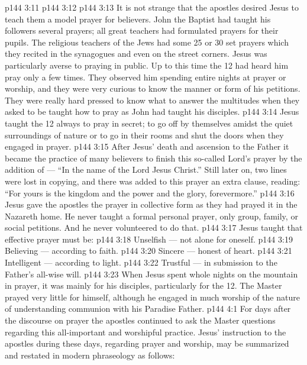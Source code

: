 \vs p144 3:11 
\vs p144 3:12 \hsetoff {}
\vspace*{1ex}
\vs p144 3:13 \pc It is not strange that the apostles desired Jesus to teach them a model prayer for believers. John the Baptist had taught his followers several prayers; all great teachers had formulated prayers for their pupils. The religious teachers of the Jews had some 25 or 30 set prayers which they recited in the synagogues and even on the street corners. Jesus was particularly averse to praying in public. Up to this time the 12 had heard him pray only a few times. They observed him spending entire nights at prayer or worship, and they were very curious to know the manner or form of his petitions. They were really hard pressed to know what to answer the multitudes when they asked to be taught how to pray as John had taught his disciples.
\vs p144 3:14 Jesus taught the 12 always to pray in secret; to go off by themselves amidst the quiet surroundings of nature or to go in their rooms and shut the doors when they engaged in prayer.
\vs p144 3:15 After Jesus’ death and ascension to the Father it became the practice of many believers to finish this so\hyp{}called Lord’s prayer by the addition of --- “In the name of the Lord Jesus Christ.” Still later on, two lines were lost in copying, and there was added to this prayer an extra clause, reading: “For yours is the kingdom and the power and the glory, forevermore.”
\vs p144 3:16 Jesus gave the apostles the prayer in collective form as they had prayed it in the Nazareth home. He never taught a formal personal prayer, only group, family, or social petitions. And he never volunteered to do that.
\vs p144 3:17 Jesus taught that effective prayer must be:
\vs p144 3:18 \bibnobreakspace Unselfish --- not alone for oneself.
\vs p144 3:19 \bibnobreakspace Believing --- according to faith.
\vs p144 3:20 \bibnobreakspace Sincere --- honest of heart.
\vs p144 3:21 \bibnobreakspace Intelligent --- according to light.
\vs p144 3:22 \bibnobreakspace Trustful --- in submission to the Father’s all\hyp{}wise will.
\vs p144 3:23 \pc When Jesus spent whole nights on the mountain in prayer, it was mainly for his disciples, particularly for the 12. The Master prayed very little for himself, although he engaged in much worship of the nature of understanding communion with his Paradise Father.
\vs p144 4:1 For days after the discourse on prayer the apostles continued to ask the Master questions regarding this all\hyp{}important and worshipful practice. Jesus’ instruction to the apostles during these days, regarding prayer and worship, may be summarized and restated in modern phraseology as follows:
